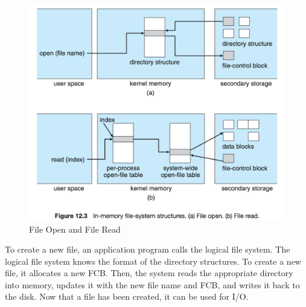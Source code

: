 \documentclass{homework}
\begin{document}
\begin{figure}[h]
\begin{center}
\includegraphics[scale=0.5]{37.png}    
\caption{File Open and File Read}
\end{center}
\end{figure}

To create a new file, an application program calls the logical file system. The logical file system knows the format of the directory structures. To create a new file, it allocates a new FCB. Then, the system reads the appropriate directory into memory, updates it with the new file name and FCB, and writes it back to the disk. Now that a file has been created, it can be used for I/O.
\end{document}
